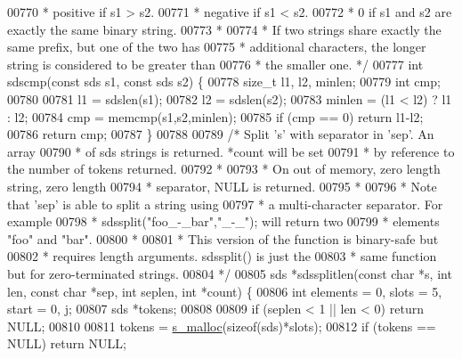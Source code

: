 \begin{DoxyCode}
{{{{{{{{{{{{{00770 \textcolor{comment}{ *     positive if s1 > s2.}
00771 \textcolor{comment}{ *     negative if s1 < s2.}
00772 \textcolor{comment}{ *     0 if s1 and s2 are exactly the same binary string.}
00773 \textcolor{comment}{ *}
00774 \textcolor{comment}{ * If two strings share exactly the same prefix, but one of the two has}
00775 \textcolor{comment}{ * additional characters, the longer string is considered to be greater than}
00776 \textcolor{comment}{ * the smaller one. */}
00777 \textcolor{keywordtype}{int} sdscmp(\textcolor{keyword}{const} sds s1, \textcolor{keyword}{const} sds s2) \{
00778     size\_t l1, l2, minlen;
00779     \textcolor{keywordtype}{int} cmp;
00780 
00781     l1 = sdslen(s1);
00782     l2 = sdslen(s2);
00783     minlen = (l1 < l2) ? l1 : l2;
00784     cmp = memcmp(s1,s2,minlen);
00785     \textcolor{keywordflow}{if} (cmp == 0) \textcolor{keywordflow}{return} l1-l2;
00786     \textcolor{keywordflow}{return} cmp;
00787 \}
00788 
00789 \textcolor{comment}{/* Split 's' with separator in 'sep'. An array}
00790 \textcolor{comment}{ * of sds strings is returned. *count will be set}
00791 \textcolor{comment}{ * by reference to the number of tokens returned.}
00792 \textcolor{comment}{ *}
00793 \textcolor{comment}{ * On out of memory, zero length string, zero length}
00794 \textcolor{comment}{ * separator, NULL is returned.}
00795 \textcolor{comment}{ *}
00796 \textcolor{comment}{ * Note that 'sep' is able to split a string using}
00797 \textcolor{comment}{ * a multi-character separator. For example}
00798 \textcolor{comment}{ * sdssplit("foo\_-\_bar","\_-\_"); will return two}
00799 \textcolor{comment}{ * elements "foo" and "bar".}
00800 \textcolor{comment}{ *}
00801 \textcolor{comment}{ * This version of the function is binary-safe but}
00802 \textcolor{comment}{ * requires length arguments. sdssplit() is just the}
00803 \textcolor{comment}{ * same function but for zero-terminated strings.}
00804 \textcolor{comment}{ */}
00805 sds *sdssplitlen(\textcolor{keyword}{const} \textcolor{keywordtype}{char} *s, \textcolor{keywordtype}{int} len, \textcolor{keyword}{const} \textcolor{keywordtype}{char} *sep, \textcolor{keywordtype}{int} seplen, \textcolor{keywordtype}{int} *count) \{
00806     \textcolor{keywordtype}{int} elements = 0, slots = 5, start = 0, j;
00807     sds *tokens;
00808 
00809     \textcolor{keywordflow}{if} (seplen < 1 || len < 0) \textcolor{keywordflow}{return} NULL;
00810 
00811     tokens = \hyperlink{sdsalloc_8h_a41e8c1188dca30db85c410c25fb417b6}{s\_malloc}(\textcolor{keyword}{sizeof}(sds)*slots);
00812     \textcolor{keywordflow}{if} (tokens == NULL) \textcolor{keywordflow}{return} NULL;
}}}}}}}}}}}}}
\end{DoxyCode}
